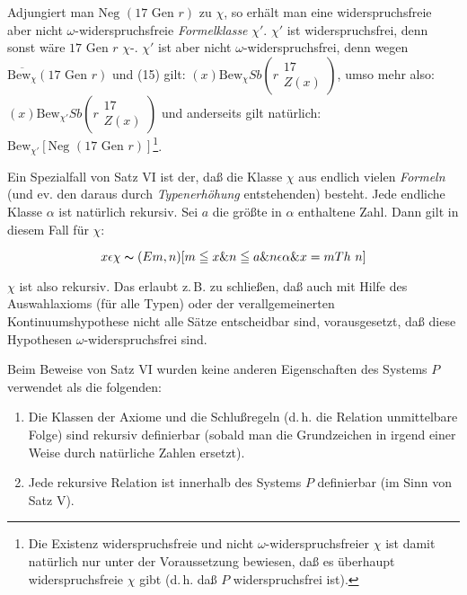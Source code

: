 \documentclass[draft]{scrartcl}
\begin{document}
Adjungiert man $\text{Neg }\left(17 \text{ Gen } r\right)$ zu $\chi$,
so erhält man eine widerspruchsfreie aber nicht $\omega$-widerspruchsfreie
\textit{Formelklasse} $\chi'$. $\chi'$ ist widerspruchsfrei, denn sonst wäre
$17 \text{ Gen } r$ $\chi$-.
$\chi'$ ist aber nicht $\omega$-widerspruchsfrei, denn wegen
$\overline{\text{Bew}_\chi}\left(17\text{ Gen } r\right)$ und (15) gilt:
$\left(x\right) \text{Bew}_\chi Sb\left(r\substack{17\\ Z\left(x\right)}\right)$, umso mehr also:
$\left(x\right)\text{Bew}_{\chi'} Sb\left(r\substack{17\\ Z\left(x\right)}\right)$
und anderseits gilt natürlich:
$\text{Bew}_{\chi'}\left[\text{Neg }\left(17\text{ Gen }r\right)\right]$\footnote{\label{fussnote46}Die Existenz
widerspruchsfreie und nicht $\omega$-widerspruchsfreier $\chi$ ist damit natürlich nur
unter der Voraussetzung bewiesen, daß es überhaupt widerspruchsfreie
$\chi$ gibt (d.\,h. daß $P$ widerspruchsfrei ist).}.

Ein Spezialfall von Satz VI ist der, daß die Klasse $\chi$ aus endlich
vielen \textit{Formeln} (und ev. den daraus durch \textit{Typenerhöhung}
entstehenden) besteht. Jede endliche Klasse $\alpha$ ist natürlich rekursiv.
Sei $a$ die größte in $\alpha$ enthaltene Zahl. Dann gilt in diesem
Fall für $\chi$:

$$
x \epsilon \chi \thicksim \left(Em, n\right) \left[m \leqq x \& n \leqq a \& n \epsilon \alpha \& x = m Th\ n\right]
$$

$\chi$ ist also rekursiv. Das erlaubt z.\,B. zu schließen, daß auch mit Hilfe
des Auswahlaxioms (für alle Typen) oder der verallgemeinerten Kontinuumshypothese nicht alle Sätze entscheidbar sind, vorausgesetzt, daß diese Hypothesen
$\omega$-widerspruchsfrei sind.

Beim Beweise von Satz VI wurden keine anderen Eigenschaften des Systems $P$ verwendet als die folgenden:

\begin{enumerate}
	\item Die Klassen der Axiome und die Schlußregeln
	 (d.\,h. die Relation \glqq unmittelbare Folge\grqq) sind rekursiv definierbar (sobald man die Grundzeichen in irgend einer Weise durch natürliche Zahlen ersetzt).
	 \item Jede rekursive Relation ist innerhalb des Systems $P$ definierbar (im Sinn von Satz V).
\end{enumerate}
\end{document}
